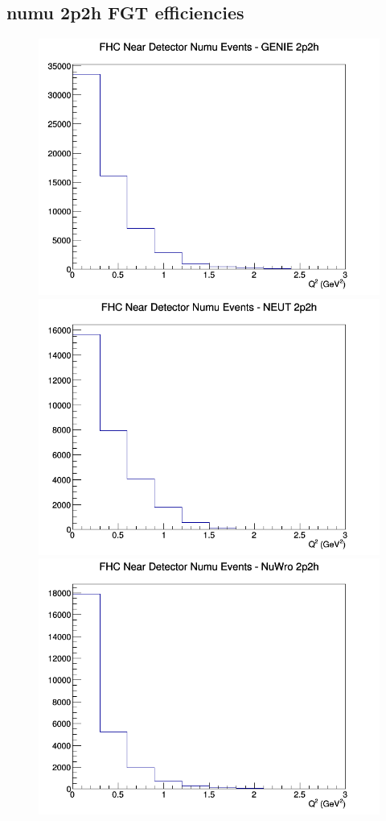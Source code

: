 \subsection{numu 2p2h FGT efficiencies}
\begin{figure}[h]
\includegraphics[width=\linewidth]{eff_Q2/FGT/2p2h_FHC_ND_numu_Q2_GENIE.png}
\endminipage
{}
\includegraphics[width=\linewidth]{eff_Q2/FGT/2p2h_FHC_ND_numu_Q2_NEUT.png}
\endminipage
{}
\includegraphics[width=\linewidth]{eff_Q2/FGT/2p2h_FHC_ND_numu_Q2_NuWro.png}

\end{figure}
